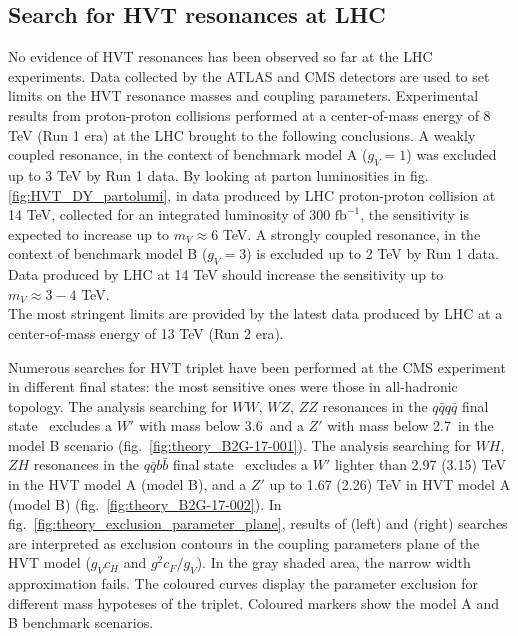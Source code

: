\clearpage

\subsection{Search for HVT resonances at LHC}
\label{sec:theory_HVT_limits_LHC}
No evidence of HVT resonances has been observed so far at the LHC experiments. Data collected by the ATLAS and CMS detectors are used to set limits on the HVT resonance masses and coupling parameters. Experimental results from proton-proton collisions performed at a center-of-mass energy of 8 TeV (Run 1 era) at the LHC brought to the following conclusions. A weakly coupled resonance, in the context of benchmark model A ($g_V = 1$) was excluded up to 3 TeV by Run 1 data. By looking at parton luminosities in fig.\ref{fig:HVT_DY_partolumi}, in data produced by LHC proton-proton collision at 14 TeV, collected for an integrated luminosity of 300 $\mbox{fb}^{-1}$, the sensitivity is expected to increase up to $m_V \approx 6$ TeV. A strongly coupled resonance, in the context of benchmark model B ($g_V = 3$) is excluded up to 2 TeV by Run 1 data. Data produced by LHC at 14 TeV should increase the sensitivity up to $m_V \approx 3-4$ TeV.\\
The most stringent limits are provided by the latest data produced by LHC at a center-of-mass energy of 13 TeV (Run 2 era).

\vspace*{1\baselineskip}

\noindent Numerous searches for HVT triplet have been performed at the CMS experiment in different final states: the most sensitive ones were those in all-hadronic topology. The analysis searching for $WW$, $WZ$, $ZZ$ resonances in the $q\bar{q}q\bar{q}$ final state~\cite{Sirunyan:2017acf,bib:CMS-PAS-B2G-17-001} excludes a $W'$ with mass below 3.6~\TeV and a $Z'$ with mass below 2.7~\TeV in the model B scenario (fig.~\ref{fig:theory_B2G-17-001}). The analysis searching for $WH$, $ZH$ resonances in the $q\bar{q} b \bar{b}$ final state~\cite{CMS:2017eme,bib:CMS-PAS-B2G-17-002} excludes a $W'$ lighter than 2.97 (3.15) TeV in the HVT model A (model B), and a $Z'$ up to 1.67 (2.26) TeV in HVT model A (model B) (fig.~\ref{fig:theory_B2G-17-002}). In fig.~\ref{fig:theory_exclusion_parameter_plane}, results of \cite{Sirunyan:2017acf,bib:CMS-PAS-B2G-17-001} (left) and \cite{CMS:2017eme,bib:CMS-PAS-B2G-17-002} (right) searches are interpreted as exclusion contours in the coupling parameters plane of the HVT model ($g_Vc_H$ and $g^2 c_F/g_V$). In the gray shaded area, the narrow width approximation fails. The coloured curves display the parameter exclusion for different mass hypoteses of the triplet. Coloured markers show the model A and B benchmark scenarios.

